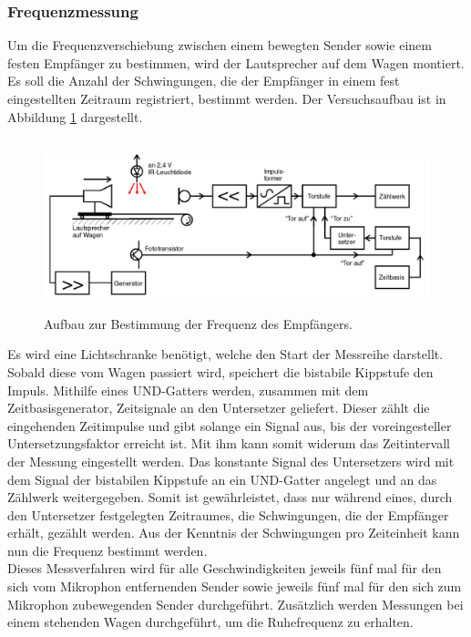 \subsubsection{Frequenzmessung}
\label{sec:durch_fre}
Um die Frequenzverschiebung zwischen einem bewegten Sender sowie einem festen Empfänger zu bestimmen, wird der Lautsprecher auf dem Wagen montiert.
Es soll die Anzahl der Schwingungen, die der Empfänger in einem fest eingestellten Zeitraum registriert, bestimmt werden.
Der Versuchsaufbau ist in Abbildung \ref{tfig:2} dargestellt.
\begin{figure}
  \centering
  \includegraphics[height=5cm]{aufbau2.png}
  \caption{Aufbau zur Bestimmung der Frequenz des Empfängers. \cite{sample}}
  \label{tfig:2}
\end{figure}
Es wird eine Lichtschranke benötigt, welche den Start der Messreihe darstellt.
Sobald diese vom Wagen passiert wird, speichert die bistabile Kippstufe den Impuls.
Mithilfe eines UND-Gatters werden, zusammen mit dem Zeitbasisgenerator, Zeitsignale an den Untersetzer geliefert.
Dieser zählt die eingehenden Zeitimpulse und gibt solange ein Signal aus, bis der voreingesteller Untersetzungsfaktor erreicht ist.
Mit ihm kann somit widerum das Zeitintervall der Messung eingestellt werden.
Das konstante Signal des Untersetzers wird mit dem Signal der bistabilen Kippstufe an ein UND-Gatter angelegt und an das Zählwerk weitergegeben.
Somit ist gewährleistet, dass nur während eines, durch den Untersetzer festgelegten Zeitraumes, die Schwingungen, die der Empfänger erhält, gezählt werden.
Aus der Kenntnis der Schwingungen pro Zeiteinheit kann nun die Frequenz bestimmt werden.\\
Dieses Messverfahren wird für alle Geschwindigkeiten jeweils fünf mal für den sich vom Mikrophon entfernenden Sender sowie jeweils fünf mal für den sich zum Mikrophon zubewegenden Sender durchgeführt.
Zusätzlich werden Messungen bei einem stehenden Wagen durchgeführt, um die Ruhefrequenz zu erhalten.

